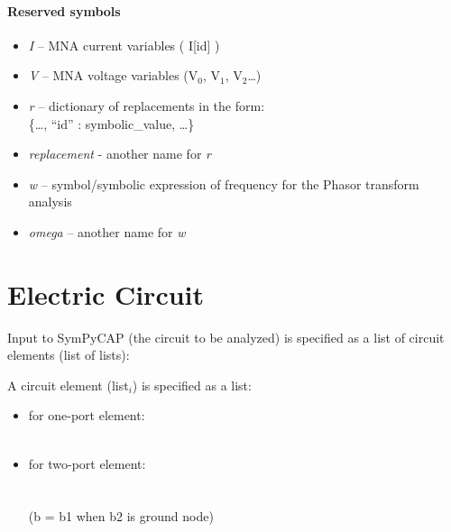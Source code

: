 \documentclass[11pt]{article}
\providecommand{\tightlist}{%
      \setlength{\itemsep}{0pt}\setlength{\parskip}{0pt}}
\begin{document}
\hypertarget{reserved-symbols}{%
\paragraph{Reserved symbols}\label{reserved-symbols}}

\begin{itemize}
\tightlist
\item
  \emph{I} \textrm{--} MNA current variables ( I{[}id{]} )
\item
  \emph{V} \textrm{--} MNA voltage variables (V\(_0\), V\(_1\), V\(_2\)\ldots)
\item
  \emph{r} \textrm{--} dictionary of replacements in the form:\\
  \{\ldots, ``id'' : symbolic\_value, \ldots\}
\item
  \emph{replacement} - another name for \emph{r}
\item
  \emph{w} \textrm{--} symbol/symbolic expression of frequency for the Phasor transform analysis
\item
  \emph{omega} \textrm{--} another name for \emph{w}
\end{itemize}
 
\newpage
\hypertarget{electric-circuit}{%
\section{Electric Circuit}\label{electric-circuit}}

\hfill\break

Input to SymPyCAP (the circuit to be analyzed) is specified as a list of
circuit elements (list of lists):


A circuit element (list\(_i\)) is specified as a list:

\begin{itemize}
\item
  for one-port element:\\
 \\
\item
  for two-port element:\\
  \\
  \\
  (b = b1 when b2 is ground node)\\[1.5ex]
\end{itemize}
\end{document}
